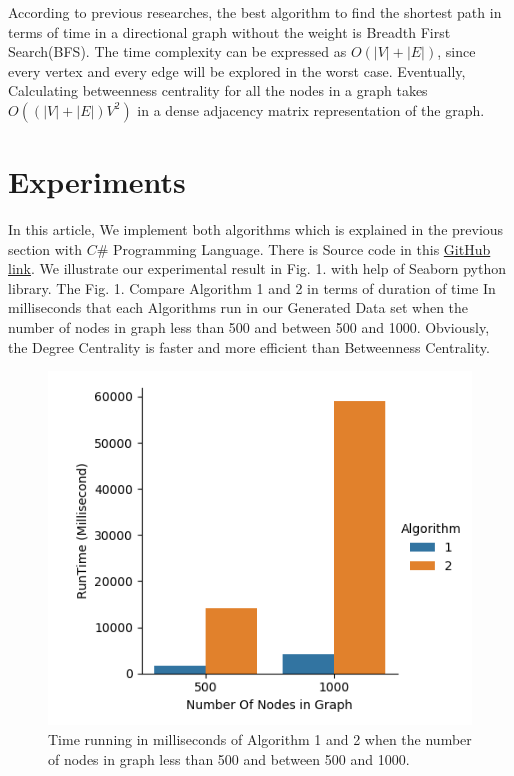 \documentclass[twocolumn,11pt]{asme2ej}
\begin{document}
According to previous researches, the best algorithm to find the shortest path  in terms of time in a directional graph without the weight is Breadth First Search(BFS). The time complexity can be expressed as $O(|V|+|E|)$, since every vertex and every edge will be explored in the worst case. Eventually, Calculating betweenness centrality for all the nodes in a graph takes $ O((|V|+|E|)V^2)$ in a dense adjacency matrix representation of the graph.

\section{Experiments}
In this article, We implement both algorithms which is explained in the previous section with $C\#$ Programming Language. There is Source code in this  \href{https://github.com/aeinsara/Influential-User-in-twitter}{ GitHub link}. We illustrate our experimental result in Fig. 1. with help of Seaborn python library. The Fig. 1. Compare Algorithm 1 and 2 in terms of duration of time In milliseconds that each Algorithms run in our Generated Data set when the number of nodes in graph less than 500 and between 500 and 1000. Obviously, the Degree Centrality is faster and more efficient than Betweenness Centrality. 

\begin{figure}[H]
	\includegraphics[scale = 0.7]{figure/figure.png}
	\caption{Time running in milliseconds of Algorithm 1 and 2 when the number of nodes in graph less than 500 and between 500 and 1000.}
	\label{figure_ASME} 
\end{figure}
\end{document}
